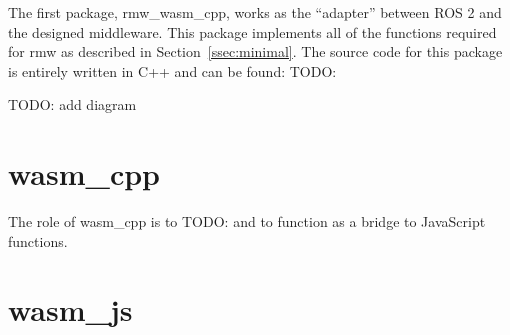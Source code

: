         The first package, \textsf{rmw\_wasm\_cpp}, works as the ``adapter'' between \ac{ROS} 2 and the designed middleware. This package implements all of the functions required for \textsf{rmw} as described in Section~\ref{ssec:minimal}. The source code for this package is entirely written in C++ and can be found: TODO:

        TODO: add diagram

    \section{\textsf{wasm\_cpp}}

        The role of \textsf{wasm\_cpp} is to TODO: and to function as a bridge to JavaScript functions.
    \section{\textsf{wasm\_js}}


